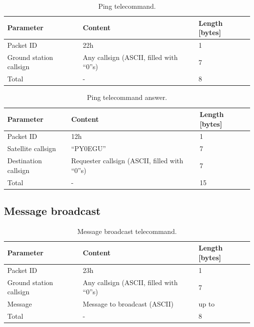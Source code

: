 \begin{table}[!h]
    \centering
    \begin{tabular}{lll}
        \toprule[1.5pt]
        \textbf{Parameter}      & \textbf{Content}                         & \textbf{Length [bytes]} \\
        \midrule
        Packet ID               & 22h                                      & 1 \\
        Ground station callsign & Any callsign (ASCII, filled with ``0''s) & 7 \\
        \midrule
        Total                   & -                                        & 8 \\
        \bottomrule[1.5pt]
    \end{tabular}
    \caption{Ping telecommand.}
    \label{tab:ping-tc}
\end{table}

\begin{table}[!h]
    \centering
    \begin{tabular}{lll}
        \toprule[1.5pt]
        \textbf{Parameter}      & \textbf{Content}                               & \textbf{Length [bytes]} \\
        \midrule
        Packet ID               & 12h                                            & 1 \\
        Satellite callsign      & ``PY0EGU''                                     & 7 \\
        Destination callsign    & Requester callsign (ASCII, filled with ``0''s) & 7 \\
        \midrule
        Total                   & -                                              & 15 \\
        \bottomrule[1.5pt]
    \end{tabular}
    \caption{Ping telecommand answer.}
    \label{tab:ping-tc-ans}
\end{table}

\subsection{Message broadcast}

\begin{table}[!h]
    \centering
    \begin{tabular}{lll}
        \toprule[1.5pt]
        \textbf{Parameter}      & \textbf{Content}                         & \textbf{Length [bytes]} \\
        \midrule
        Packet ID               & 23h                                      & 1 \\
        Ground station callsign & Any callsign (ASCII, filled with ``0''s) & 7 \\
        Message                 & Message to broadcast (ASCII)             & up to  \\
        \midrule
        Total                   & -                                        & 8 \\
        \bottomrule[1.5pt]
    \end{tabular}
    \caption{Message broadcast telecommand.}
    \label{tab:msg-broadcast-tc}
\end{table}

